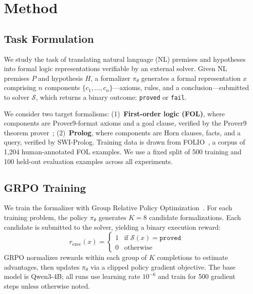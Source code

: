 \section{Method}
\label{sec:method}

\subsection{Task Formulation}
\label{sec:task}

We study the task of translating natural language (NL) premises and hypotheses into formal logic representations verifiable by an external solver.
Given NL premises $P$ and hypothesis $H$, a formalizer $\pi_\theta$ generates a formal representation $x$ comprising $n$ components $\{c_1, \ldots, c_n\}$---axioms, rules, and a conclusion---submitted to solver $\mathcal{S}$, which returns a binary outcome: \texttt{proved} or \texttt{fail}.

We consider two target formalisms:
(1)~\textbf{First-order logic (FOL)}, where components are Prover9-format axioms and a goal clause, verified by the Prover9 theorem prover~\cite{mccune2010prover9};
(2)~\textbf{Prolog}, where components are Horn clauses, facts, and a query, verified by SWI-Prolog.
Training data is drawn from FOLIO~\cite{folio}, a corpus of 1{,}204 human-annotated FOL examples.
We use a fixed split of 500 training and 100 held-out evaluation examples across all experiments.

\subsection{GRPO Training}
\label{sec:grpo}

We train the formalizer with Group Relative Policy Optimization~\citep[GRPO;][]{deepseekmath}.
For each training problem, the policy $\pi_\theta$ generates $K{=}8$ candidate formalizations.
Each candidate is submitted to the solver, yielding a binary execution reward:
\begin{equation}
  r_{\text{exec}}(x) =
  \begin{cases}
    1 & \text{if } \mathcal{S}(x) = \texttt{proved} \\
    0 & \text{otherwise}
  \end{cases}
  \label{eq:r_exec}
\end{equation}
GRPO normalizes rewards within each group of $K$ completions to estimate advantages, then updates $\pi_\theta$ via a clipped policy gradient objective.
The base model is Qwen3-4B; all runs use learning rate $10^{-6}$ and train for 500 gradient steps unless otherwise noted.

